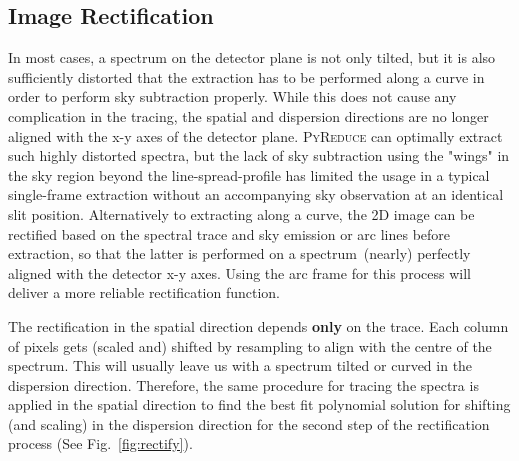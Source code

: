 \documentclass[fleqn,usenatbib]{mnras}
\begin{document}
\subsection{Image Rectification}
In most cases, a spectrum on the detector plane is not only tilted,
but it is also sufficiently distorted that the extraction has to be
performed along a curve in order to perform sky subtraction properly.
While this does not cause any complication in the tracing, the
spatial and dispersion directions are no longer aligned with the x-y
axes of the detector plane. \textsc{PyReduce} can optimally extract
such highly distorted spectra, but the lack of sky subtraction using
the "wings" in the sky region beyond the line-spread-profile has
limited the usage in a typical single-frame extraction without an
accompanying sky observation at an identical slit position.
Alternatively to extracting along a curve, the 2D image can be
rectified based on the spectral trace and sky emission or arc lines
before extraction, so that the latter is performed on a spectrum~(nearly)
perfectly aligned with the detector x-y axes. Using the arc frame for
this process will deliver a more reliable rectification function.

The rectification in the spatial direction depends \textbf{only}
on the trace. Each column of pixels gets (scaled and) shifted by
resampling to align with the centre of the spectrum. This will
usually leave us with a spectrum tilted or curved in the dispersion
direction. Therefore, the same procedure for tracing the spectra is
applied in the spatial direction to find the best fit polynomial
solution for shifting (and scaling) in the dispersion direction for
the second step of the rectification process (See Fig.~\ref{fig:rectify}).
\end{document}

